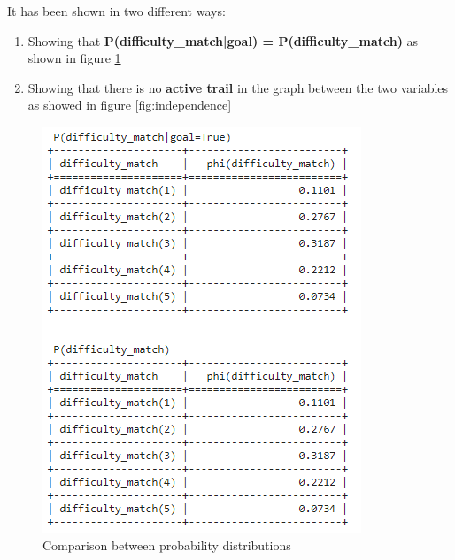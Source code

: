 \documentclass[a4paper,10pt]{report}
\begin{document}
It has been shown in two different ways:
\begin{enumerate}
    \item Showing that \textbf{P(difficulty_match|goal) = P(difficulty_match)} as shown in figure \ref{fig:prob_distributions}
    \item Showing that there is no \textbf{active trail} in the graph between the two variables as showed in figure \ref{fig:independence}
\end{enumerate}

\begin{figure}[h]
  \centering\begin{minipage}[b]{0.45\textwidth}
    \includegraphics[width=\textwidth]{assets/img/prob_distributions.PNG}
\caption{Comparison between probability distributions}
\label{fig:prob_distributions}
  \end{minipage}
  \hfill\begin{minipage}[b]{0.45\textwidth}

\end{minipage}
\end{figure}
\end{document}
